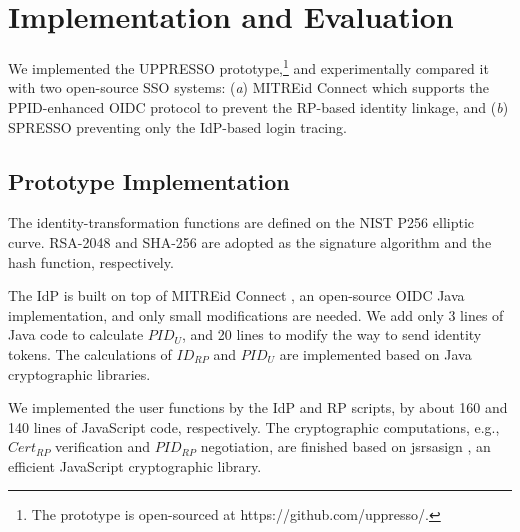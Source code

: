 \section{Implementation and Evaluation}
\label{sec:implementation}
We implemented the UPPRESSO prototype,\footnote{The prototype is open-sourced at https://github.com/uppresso/.}
 and experimentally compared it
 with two open-source SSO systems:
  (\emph{a}) MITREid Connect \cite{MITREid}
    which supports the PPID-enhanced OIDC protocol to prevent the RP-based identity linkage,
     and (\emph{b}) SPRESSO \cite{SPRESSO} preventing only the IdP-based login tracing.


\subsection{Prototype Implementation}
\label{subsec:proto-imple}
The identity-transformation functions are defined on
        the NIST P256 elliptic curve.
RSA-2048 and SHA-256 are adopted as the signature algorithm and the hash function, respectively.

The IdP is built on top of MITREid Connect \cite{MITREid},
    an open-source OIDC Java implementation, %
    and only small modifications are needed.
We add only 3 lines of Java code to calculate $PID_U$,
    and 20 lines to modify the way to send identity tokens.
The calculations of $ID_{RP}$ and $PID_U$ are implemented based on Java cryptographic libraries.

We implemented the user functions by the IdP and RP scripts,
     by about 160 and 140 lines of JavaScript code, respectively.
The cryptographic computations, e.g., $Cert_{RP}$ verification and $PID_{RP}$ negotiation, are finished based on jsrsasign \cite{jsrsasign}, an efficient JavaScript cryptographic library.

